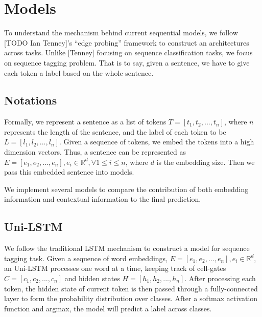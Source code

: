 \documentclass{article}
\newcommand{\red}[1]{\textcolor{red}{#1}}
\begin{document}
\section{Models}

To understand the mechanism behind current sequential models, we follow [TODO Ian Tenney]'s ``edge probing'' framework to construct an architectures across tasks. Unlike [Tenney] focusing on sequence classification tasks, we focus on sequence tagging problem. That is to say, given a sentence, we have to give each token a label based on the whole sentence.

\subsection{Notations}
Formally, we represent a sentence as a list of tokens $T = [t_1, t_2, ... , t_n]$, where $n$ represents the length of the sentence, and the label of each token to be $L = [l_1, l_2, ... , l_n]$. Given a sequence of tokens, we embed the tokens into a high dimension vectors. Thus, a sentence can be represented as $E = [e_1, e_2, ... , e_n], e_i \in \mathbb{R}^d, \forall 1 \leq i \leq n$, where $d$ is the embedding size. Then we pass this embedded sentence into models.


We implement several models to compare the contribution of both embedding information and contextual information to the final prediction. 


\subsection{Uni-LSTM}

We follow the traditional LSTM mechanism to construct a model for sequence tagging task. Given a sequence of word embeddings, $E = [e_1, e_2, ... , e_n], e_i \in \mathbb{R}^d$, an Uni-LSTM processes one word at a time, keeping track of cell-gates $C = [c_1, c_2, ... , c_n]$ and hidden states $H = [h_1, h_2, ... , h_n]$. After processing each token, the hidden state of current token is then passed through a fully-connected layer to form the probability distribution over classes. After a softmax activation function and argmax, the model will predict a label across classes.
\end{document}
